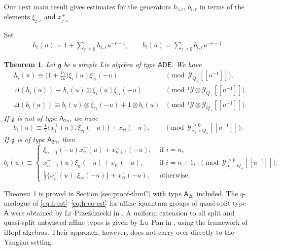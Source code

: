 \documentclass[11pt,reqno]{amsart}
\numberwithin{equation}{section}
\newtheorem{thm}{Theorem}[section]
\theoremstyle{definition}
\theoremstyle{remark}
\newcommand{\beq}{\begin{equation}}
\newcommand{\eeq}{\end{equation}}
\newcommand{\g}{\mathfrak{g}}
\newcommand{\gge}{\geqslant}
\newcommand{\Y}{{\mathscr{Y}}}
\newcommand{\Yi}{{^\imath\mathscr{Y}}}
\begin{document}
Our next main result gives estimates for the generators $h_{i,r}$, $b_{i,r}$ in terms of the elements $\xi_{j,s}$ and $x_{j,s}^\pm$.



Set 
\begin{align*}
h_i(u)=1+\sum_{r\gge 0}h_{i,r}u^{-r-1},\qquad b_i(u)=\sum_{r\gge 0}b_{i,r}u^{-r-1}.
\end{align*}
\begin{thm}\label{thm:hb}
Let $\g$ be a simple Lie algebra of type $\mathsf{ADE}$. We have
\begin{align}
&h_i(u)\equiv \big(1+\tfrac{\wp_i}{4u}\big)\xi_i(u)\xi_{\tau i}(-u) &\pmod{\Y_{Q_+}[\![u^{-1}]\!]},\label{eq:h-est}\\
&\Delta(h_i(u))\equiv h_i(u)\otimes\xi_i(u)\xi_{\tau i}(-u)  &\pmod{\Yi\otimes \Y_{Q_+}[\![u^{-1}]\!]},\label{eq:h-co-est}\\
&\Delta(b_i(u))\equiv b_i(u)\otimes\xi_{\tau i}(-u)+1\otimes b_i(u) &\pmod{\Yi\otimes \Y_{Q_+}[\![u^{-1}]\!]}.\label{eq:b-co-est}
\end{align}
If $\g$ is not of type $\mathsf A_{2n}$, we have
\beq
b_i(u)\equiv 
\tfrac12 \{x_i^+(u),\xi_{\tau i}(-u)\}+x_{\tau i}^-(-u), 
\qquad \pmod{\Y_{\alpha_i+Q_+}^{\gge 0}[\![u^{-1}]\!]}.\label{eq:b-est}
\eeq
If $\g$ is of type $\mathsf A_{2n}$, then
\beq
b_i(u)\equiv \begin{cases}
\xi_{n+1}(-u)x_n^+(u)+x_{n+1}^-(-u),&\text{ if }i=n,\\
x_{n+1}^+(u)\xi_n(-u)+x_n^-(-u),&\text{ if }i=n+1,\\
\tfrac12 \{x_i^+(u),\xi_{\tau i}(-u)\}+x_{\tau i}^-(-u), &\text{ otherwise. }
\end{cases}   \pmod{\Y_{\alpha_i+Q_+}^{\gge 0}[\![u^{-1}]\!]}.\label{eq:b-est2}
\eeq
\end{thm}

Theorem \ref{thm:hb} is proved in Section \ref{sec:proof-thmC} with type $\mathsf A_{2n}$ included. The $q$-analogue of \eqref{eq:h-est}--\eqref{eq:h-co-est} for affine iquantum groups of quasi-split type $\mathsf A$ were obtained by Li--Prze\'zdziecki in \cite{LP26qchar}. A uniform extension to all split and quasi-split untwisted affine types is given by Lu--Pan in \cite[Theorem~3.18]{LuPan26Drinfeld}, using the framework of iHopf algebras. Their approach, however, does not carry over directly to the Yangian setting.
\end{document}
